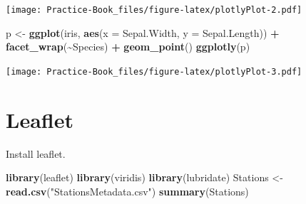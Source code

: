 \documentclass[
]{book}
\newenvironment{Shaded}{\begin{snugshade}}{\end{snugshade}}
\newcommand{\DataTypeTok}[1]{\textcolor[rgb]{0.13,0.29,0.53}{#1}}
\newcommand{\KeywordTok}[1]{\textcolor[rgb]{0.13,0.29,0.53}{\textbf{#1}}}
\newcommand{\NormalTok}[1]{#1}
\newcommand{\OperatorTok}[1]{\textcolor[rgb]{0.81,0.36,0.00}{\textbf{#1}}}
\newcommand{\StringTok}[1]{\textcolor[rgb]{0.31,0.60,0.02}{#1}}
\begin{document}
\texttt{[image: Practice-Book\_files/figure-latex/plotlyPlot-2.pdf]}

\begin{Shaded}
\begin{Highlighting}[]
\NormalTok{p \textless{}{-}}\StringTok{ }\KeywordTok{ggplot}\NormalTok{(iris, }\KeywordTok{aes}\NormalTok{(}\DataTypeTok{x =}\NormalTok{ Sepal.Width, }\DataTypeTok{y =}\NormalTok{ Sepal.Length)) }\OperatorTok{+}\StringTok{ }\KeywordTok{facet\_wrap}\NormalTok{(}\OperatorTok{\textasciitilde{}}\NormalTok{Species) }\OperatorTok{+}\StringTok{  }\KeywordTok{geom\_point}\NormalTok{()}
\KeywordTok{ggplotly}\NormalTok{(p)}
\end{Highlighting}
\end{Shaded}

\texttt{[image: Practice-Book\_files/figure-latex/plotlyPlot-3.pdf]}

\hypertarget{leaflet}{%
\section{Leaflet}\label{leaflet}}

Install leaflet.

\begin{Shaded}
\begin{Highlighting}[]
\KeywordTok{library}\NormalTok{(leaflet)}
\KeywordTok{library}\NormalTok{(viridis)}
\KeywordTok{library}\NormalTok{(lubridate)}
\NormalTok{Stations \textless{}{-}}\StringTok{ }\KeywordTok{read.csv}\NormalTok{(}\StringTok{"StationsMetadata.csv"}\NormalTok{)}
\KeywordTok{summary}\NormalTok{(Stations)}
\end{Highlighting}
\end{Shaded}
\end{document}
